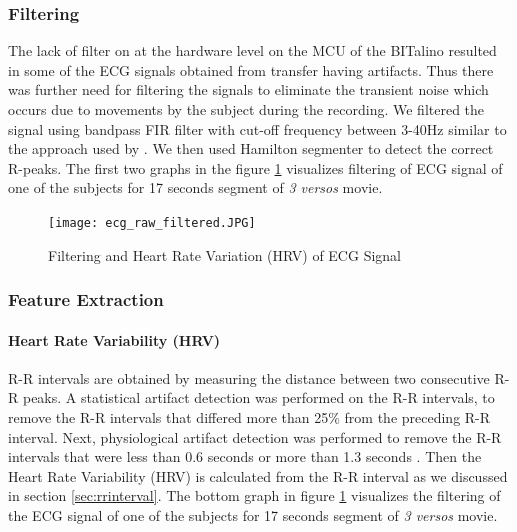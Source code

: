 \subsubsection{Filtering} The lack of filter on at the hardware level on the MCU \cite{noauthor_faq_nodate} of the BITalino resulted in some of the ECG signals obtained from transfer having artifacts. Thus there was further need for filtering the signals to eliminate the transient noise which occurs due to movements by the subject during the recording. We filtered the signal using bandpass FIR filter with cut-off frequency between 3-40Hz similar to the approach used by \citeauthor{canento_review_nodate} \cite{canento_review_nodate}. We then used Hamilton segmenter \cite{hamilton_open_2002} to detect the correct R-peaks. The first two graphs in the figure \ref{fig:ecg_filtering} visualizes filtering of ECG signal of one of the subjects for 17 seconds segment of \textit{3 versos} movie.

\begin{figure}
    \centering
    \texttt{[image: ecg\_raw\_filtered.JPG]}
    \caption{Filtering and Heart Rate Variation (HRV) of ECG Signal}
    \label{fig:ecg_filtering}
\end{figure}

\subsubsection{Feature Extraction} 
\label{sec:ecg_fet_ext}
\paragraph{Heart Rate Variability (HRV)} R-R intervals are obtained by measuring the distance between two consecutive R-R peaks. A statistical artifact detection was performed on the R-R intervals, to remove the R-R intervals that differed more than 25\% from the preceding R-R interval. Next, physiological artifact detection was performed to remove the R-R intervals that were less than 0.6 seconds or more than 1.3 seconds \cite{noauthor_normal_2018}. Then the Heart Rate Variability (HRV) is calculated from the R-R interval as we discussed in section \ref{sec:rrinterval}. The bottom graph in figure \ref{fig:ecg_filtering} visualizes the filtering of the ECG signal of one of the subjects for 17 seconds segment of \textit{3 versos} movie.

